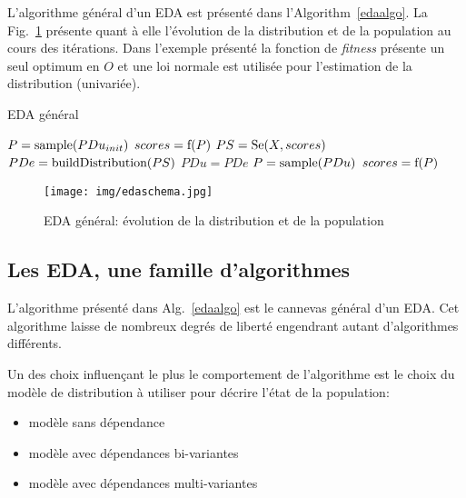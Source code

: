 \documentclass[a4paper, 11pt]{report}
\begin{document}
L'algorithme général d'un EDA est présenté dans l'Algorithm~\ref{edaalgo}. La Fig.~\ref{edaschema} présente quant à elle l'évolution de la distribution et de la population au cours des itérations. Dans l'exemple présenté la fonction de \textit{fitness} présente un seul optimum en $O$ et une loi normale est utilisée pour l'estimation de la distribution (univariée).

\begin{algorithm}                      
\caption{EDA général}          
\label{edaalgo}                           
\begin{algorithmic}                    
\STATE $P = \textnormal{sample}(PDu_{init})$ 
\STATE $scores = \textnormal{f}(P)$ 
\STATE $PS = \textnormal{Se}(X, scores)$ 
\STATE $PDe = \textnormal{buildDistribution}(PS)$ 
\STATE $PDu = PDe$
\STATE $P = \textnormal{sample}(PDu)$ 
\STATE $scores = \textnormal{f}(P)$ 
\ENDWHILE
\end{algorithmic}
\end{algorithm}

\begin{figure}[!h]
\centering
\texttt{[image: img/edaschema.jpg]}
\caption{EDA général: évolution de la distribution et de la population~\cite{WIKI_EDA}}
\label{edaschema}
\end{figure}


\subsection{Les EDA, une famille d'algorithmes}
L'algorithme présenté dans Alg.~\ref{edaalgo} est le cannevas général d'un EDA. Cet algorithme laisse de nombreux degrés de liberté engendrant autant d'algorithmes différents.

Un des choix influençant le plus le comportement de l'algorithme est le choix du modèle de distribution à utiliser pour décrire l'état de la population:
\begin{itemize}
\item modèle sans dépendance
\item modèle avec dépendances bi-variantes 
\item modèle avec dépendances multi-variantes
\end{itemize}
\end{document}

